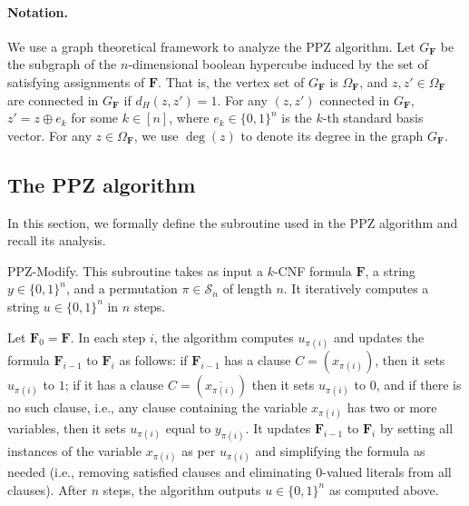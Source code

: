 \documentclass[11pt, letterpaper]{article}
\theoremstyle{definition}
\newcommand{\f}{\mathbf{F}}
\newcommand{\Om}{\Omega_{\f}}
\newcommand{\PPZMod}{\textsf{PPZ-Modify}}
\begin{document}
\paragraph{Notation.} We use a graph theoretical framework to analyze the PPZ algorithm. Let $G_\f$ be the subgraph of the $n$-dimensional boolean hypercube induced by the set of satisfying assignments of $\f$. That is, the vertex set of $G_\f$ is $\Om$, and $z,z' \in \Om$ are connected in $G_\f$ if $d_H(z,z')=1$. For any $(z,z')$ connected in $G_\f$, $z' = z \oplus e_k$ for some $k \in [n]$, where $e_k \in \{0,1\}^n$ is the $k$-th standard basis vector. For any $z \in \Om$, we use $\deg(z)$ to denote its degree in the graph $G_\f$. 

\subsection{The PPZ algorithm} \label{sec:ppzdetails}

In this section, we formally define the subroutine used in the PPZ algorithm and recall its analysis.

\noindent

\PPZMod. This subroutine takes as input a $k$-CNF formula $\f$, a string $y \in \{0,1\}^n$, and a permutation $\pi \in \mathcal{S}_n$ of length $n$. It iteratively computes a string $u \in \{0,1\}^n$ in $n$ steps. 

\noindent
Let $\f_0 = \f$. In each step $i$, the algorithm computes $u_{\pi(i)}$ and updates the formula $\f_{i-1}$ to $\f_i$ as follows: if $\f_{i-1}$ has a clause $C = (x_{\pi(i)})$, then it sets $u_{\pi(i)}$ to $1$; if it has a clause $C = (\overline{x_{\pi(i)}})$ then it sets $u_{\pi(i)}$ to $0$, and if there is no such clause, i.e., any clause containing the variable $x_{\pi(i)}$ has two or more variables, then it sets $u_{\pi(i)}$ equal to $y_{\pi(i)}$. It updates $\f_{i-1}$ to $\f_i$ by setting all instances of the variable $x_{\pi(i)}$ as per $u_{\pi(i)}$ and simplifying the formula as needed (i.e., removing satisfied clauses and eliminating $0$-valued literals from all clauses).  After $n$ steps, the algorithm outputs $u \in \{0,1\}^n$ as computed above.
\end{document}
